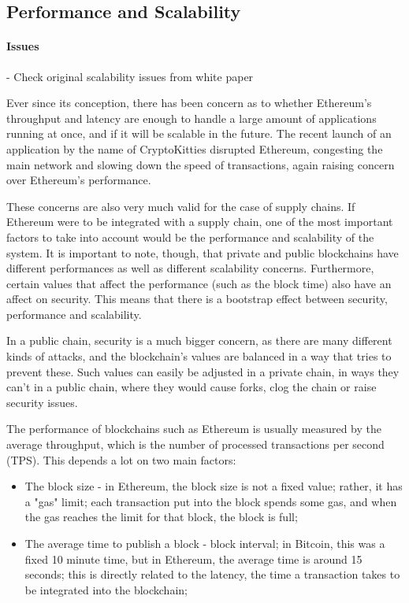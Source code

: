 
\subsection{Performance and Scalability}

\paragraph{Issues} 
- Check original scalability issues from white paper

Ever since its conception, there has been concern as to whether Ethereum's throughput and latency are enough to handle a large amount of applications running at once, and if it will be scalable in the future. The recent launch of an application by the name of CryptoKitties disrupted Ethereum, congesting the main network and slowing down the speed of transactions, again raising concern over Ethereum's performance.

These concerns are also very much valid for the case of supply chains. If Ethereum were to be integrated with a supply chain, one of the most important factors to take into account would be the performance and scalability of the system. It is important to note, though, that private and public blockchains have different performances as well as different scalability concerns. Furthermore, certain values that affect the performance (such as the block time) also have an affect on security. This means that there is a bootstrap effect between security, performance and scalability.

In a public chain, security is a much bigger concern, as there are many different kinds of attacks, and the blockchain's values are balanced in a way that tries to prevent these. Such values can easily be adjusted in a private chain, in ways they can't in a public chain, where they would cause forks, clog the chain or raise security issues. 

The performance of blockchains such as Ethereum is usually measured by the average throughput, which is the number of processed transactions per second (TPS). This depends a lot on two main factors:
\begin{itemize}
\item The block size - in Ethereum, the block size is not a fixed value; rather, it has a "gas" limit; each transaction put into the block spends some gas, and when the gas reaches the limit for that block, the block is full;
\item The average time to publish a block - block interval; in Bitcoin, this was a fixed 10 minute time, but in Ethereum, the average time is around 15 seconds; this is directly related to the latency, the time a transaction takes to be integrated into the blockchain;
\end{itemize}

